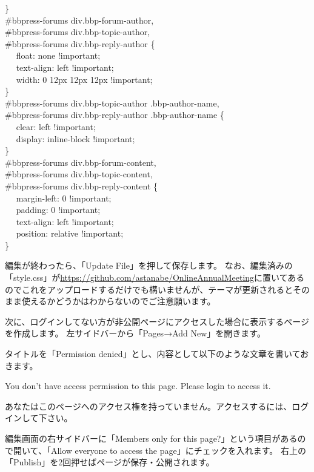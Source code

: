 \documentclass[titlepage,10pt,a4paper,uplatex]{jsbook}
\newenvironment{content}{\begin{shaded}\vspace{-1em}\raggedright\ttfamily\footnotesize\setlength{\baselineskip}{1.4em}}{\end{shaded}\vspace{-1em}}
\begin{document}
\begin{content}
\}\\
\#bbpress-forums div.bbp-forum-author,\\
\#bbpress-forums div.bbp-topic-author,\\
\#bbpress-forums div.bbp-reply-author \{\\
 ~ ~float: none !important;\\
 ~ ~text-align: left !important;\\
 ~ ~width: 0 12px 12px 12px !important;\\
\}\\
\#bbpress-forums div.bbp-topic-author .bbp-author-name,\\
\#bbpress-forums div.bbp-reply-author .bbp-author-name \{\\
 ~ ~clear: left !important;\\
 ~ ~display: inline-block !important;\\
\}\\
\#bbpress-forums div.bbp-forum-content,\\
\#bbpress-forums div.bbp-topic-content,\\
\#bbpress-forums div.bbp-reply-content \{\\
 ~ ~margin-left: 0 !important;\\
 ~ ~padding: 0 !important;\\
 ~ ~text-align: left !important;\\
 ~ ~position: relative !important;\\
\}
\end{content}

編集が終わったら、「Update File」を押して保存します。
なお、編集済みの「style.css」が\url{https://github.com/astanabe/OnlineAnnualMeeting}に置いてあるのでこれをアップロードするだけでも構いませんが、テーマが更新されるとそのまま使えるかどうかはわからないのでご注意願います。

次に、ログインしてない方が非公開ページにアクセスした場合に表示するページを作成します。
左サイドバーから「Pages→Add New」を開きます。

タイトルを「Permission denied」とし、内容として以下のような文章を書いておきます。

\begin{content}
You don't have access permission to this page. Please login to access it.

あなたはこのページへのアクセス権を持っていません。アクセスするには、ログインして下さい。
\end{content}

編集画面の右サイドバーに「Members only for this page?」という項目があるので開いて、「Allow everyone to access the page」にチェックを入れます。
右上の「Publish」を2回押せばページが保存・公開されます。
\end{document}
